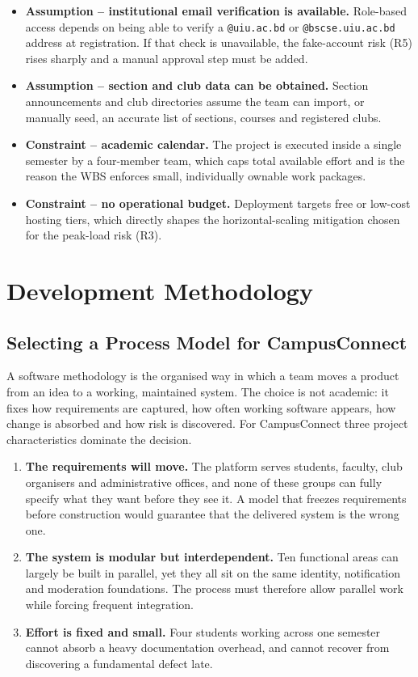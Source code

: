\documentclass[11pt,a4paper]{report}
\begin{document}
\begin{itemize}
  \item \textbf{Assumption -- institutional email verification is available.}
  Role-based access depends on being able to verify a \texttt{@uiu.ac.bd} or
  \texttt{@bscse.uiu.ac.bd} address at registration. If that check is
  unavailable, the fake-account risk (R5) rises sharply and a manual approval
  step must be added.
  \item \textbf{Assumption -- section and club data can be obtained.} Section
  announcements and club directories assume the team can import, or manually
  seed, an accurate list of sections, courses and registered clubs.
  \item \textbf{Constraint -- academic calendar.} The project is executed inside
  a single semester by a four-member team, which caps total available effort and
  is the reason the WBS enforces small, individually ownable work packages.
  \item \textbf{Constraint -- no operational budget.} Deployment targets
  free or low-cost hosting tiers, which directly shapes the horizontal-scaling
  mitigation chosen for the peak-load risk (R3).
\end{itemize}
\chapter{Development Methodology}
\label{ch:method}

\section{Selecting a Process Model for CampusConnect}

A software methodology is the organised way in which a team moves a product from
an idea to a working, maintained system. The choice is not academic: it fixes how
requirements are captured, how often working software appears, how change is
absorbed and how risk is discovered. For CampusConnect three project
characteristics dominate the decision.

\begin{enumerate}
  \item \textbf{The requirements will move.} The platform serves students,
  faculty, club organisers and administrative offices, and none of these groups
  can fully specify what they want before they see it. A model that freezes
  requirements before construction would guarantee that the delivered system is
  the wrong one.
  \item \textbf{The system is modular but interdependent.} Ten functional areas
  can largely be built in parallel, yet they all sit on the same identity,
  notification and moderation foundations. The process must therefore allow
  parallel work while forcing frequent integration.
  \item \textbf{Effort is fixed and small.} Four students working across one
  semester cannot absorb a heavy documentation overhead, and cannot recover from
  discovering a fundamental defect late.
\end{enumerate}
\end{document}
